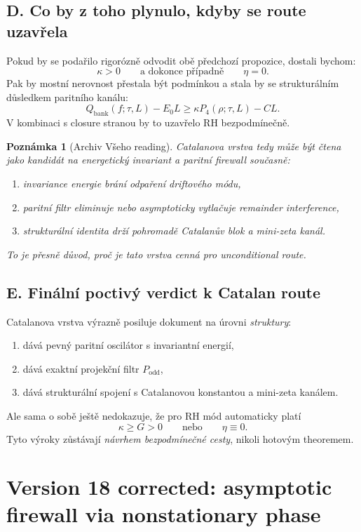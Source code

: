 \documentclass[11pt,a4paper]{article}
\newtheorem{remark}[theorem]{Poznámka}
\begin{document}
\subsection*{D. Co by z toho plynulo, kdyby se route uzavřela}

Pokud by se podařilo rigorózně odvodit obě předchozí propozice, dostali bychom:
\[
\kappa>0
\qquad\text{a dokonce případně}\qquad
\eta=0.
\]
Pak by mostní nerovnost přestala být podmínkou a stala by se strukturálním důsledkem paritního
kanálu:
\[
Q_{\mathrm{bank}}(f;\tau,L)-E_0L
\ge
\kappa P_4(\rho;\tau,L)-C L.
\]
V kombinaci s closure stranou by to uzavřelo RH bezpodmínečně.

\begin{remark}[Archiv Všeho reading]
Catalanova vrstva tedy může být čtena jako kandidát na \emph{energetický invariant} a
\emph{paritní firewall} současně:
\begin{enumerate}[label=\textbf{(\arabic*)}]
\item invariance energie brání odpaření driftového módu,
\item paritní filtr eliminuje nebo asymptoticky vytlačuje remainder interference,
\item strukturální identita drží pohromadě Catalanův blok a mini-zeta kanál.
\end{enumerate}
To je přesně důvod, proč je tato vrstva cenná pro unconditional route.
\end{remark}

\subsection*{E. Finální poctivý verdict k Catalan route}

Catalanova vrstva výrazně posiluje dokument na úrovni \emph{struktury}:
\begin{enumerate}[label=\textbf{(\arabic*)}]
\item dává pevný paritní oscilátor s invariantní energií,
\item dává exaktní projekční filtr \(P_{\mathrm{odd}}\),
\item dává strukturální spojení s Catalanovou konstantou a mini-zeta kanálem.
\end{enumerate}
Ale sama o sobě ještě nedokazuje, že pro RH mód automaticky platí
\[
\kappa\ge G>0
\qquad\text{nebo}\qquad
\eta\equiv 0.
\]
Tyto výroky zůstávají \emph{návrhem bezpodmínečné cesty}, nikoli hotovým theoremem.



\section{Version 18 corrected: asymptotic firewall via nonstationary phase}
\end{document}
